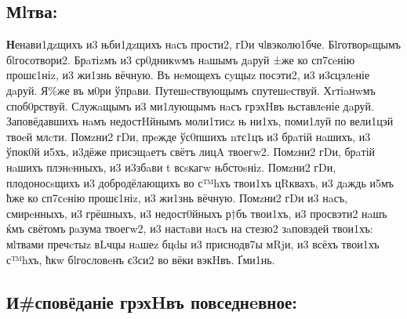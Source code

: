 \subsection[Молитва]{Мlтва:}

\textbf{Н}енави1дzщихъ и3 њби1дzщихъ нaсъ прости2, гDи чlвэколю1бче.
Бlготворsщымъ бlгосотвори2. Брaтіzмъ и3 ср0дникwмъ нaшымъ дaруй ±же ко
сп7сeнію прошє1ніz, и3 жи1знь вёчную. Въ нeмощехъ сyщыz посэти2, и3
и3сцэлeніе дaруй. Я\%же въ м0ри ўпрaви. Путешeствующымъ спутешeствуй.
Хrтіaнwмъ споб0рствуй. Служaщымъ и3 ми1лующымъ нaсъ грэхHвъ њставлeніе
дaруй. Заповёдавшихъ нaмъ недостHйнымъ моли1тисz њ ни1хъ, поми1луй по
вели1цэй твоeй млcти. Помzни2 гDи, прeжде ўс0пшихъ nтє1цъ и3 брaтій
нaшихъ, и3 ўпок0й и5хъ, и3дёже присэщaетъ свётъ лицA твоегw2. Помzни2
гDи, брaтій нaшихъ плэнeнныхъ, и3 и3збaви \textbar{} t всsкагw
њбстоsніz. Помzни2 гDи, плодоносsщихъ и3 добродёлающихъ во с™hхъ твои1хъ
цRквахъ, и3 дaждь и5мъ ћже ко сп7сeнію прошє1ніz, и3 жи1знь вёчную.
Помzни2 гDи и3 нaсъ, смирeнныхъ, и3 грёшныхъ, и3 недост0йныхъ р†бъ
твои1хъ, и3 просвэти2 нaшъ ќмъ свётомъ рaзума твоегw2, и3 настaви нaсъ
на стезю2 зaповэдей твои1хъ: мlтвами пречcтыz вLчцы нaшеz бцdы и3
приснодв7ы мRjи, и3 всёхъ твои1хъ с™hхъ, ћкw бlгословeнъ є3си2 во вёки
вэкHвъ. Ґми1нь.

\subsection[Исповедание грехов повседневное]
{И\#сповёданіе грэхHвъ повседнeвное:}

